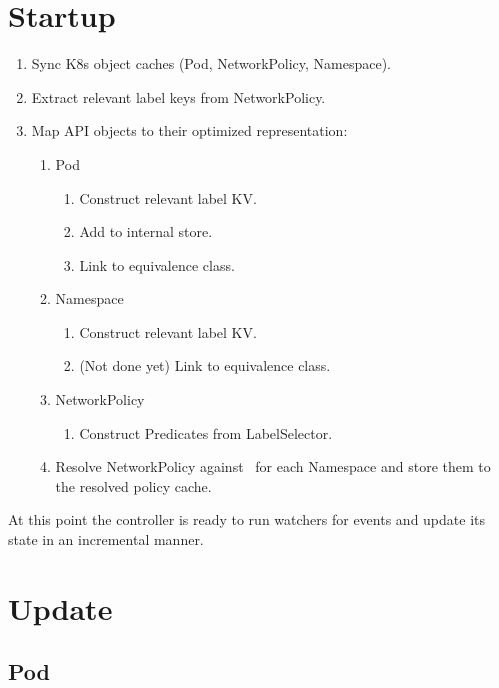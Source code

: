 \documentclass[11pt]{article}
\begin{document}
\section{Startup}

\begin{enumerate}
    \item Sync K8s object caches (Pod, NetworkPolicy, Namespace).
    \item Extract relevant label keys from NetworkPolicy.
    \item Map API objects to their optimized representation:
    \begin{enumerate}
        \item Pod
            \begin{enumerate}
                \item Construct relevant label KV\@.
                \item Add to internal store.
                \item Link to equivalence class.
            \end{enumerate}
        \item Namespace 
            \begin{enumerate}
                \item Construct relevant label KV\@.
                \item (Not done yet) Link to equivalence class.
            \end{enumerate}
        \item NetworkPolicy
            \begin{enumerate}
                \item Construct Predicates from LabelSelector.
            \end{enumerate}
    \item Resolve NetworkPolicy against \podeqc\ for each Namespace and store them to the
            resolved policy cache.
    \end{enumerate}
\end{enumerate}

At this point the controller is ready to run watchers for events and update
its state in an incremental manner.

\section{Update}

\subsection{Pod}
\end{document}
